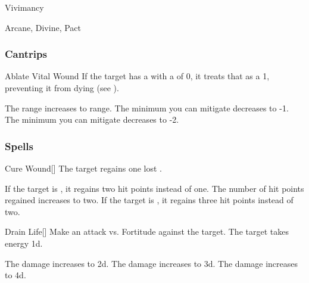\newpage
\begin{spellsection}{Vivimancy}

\begin{spellheader}
\end{spellheader}


 Arcane, Divine, Pact

\subsubsection{Cantrips}


\begin{freeability}{Ablate Vital Wound}
If the target has a  with a  of 0, it treats that  as a 1, preventing it from dying (see ).

\rankline
{} The range increases to \rngmed range.
 The minimum  you can mitigate decreases to -1.
 The minimum  you can mitigate decreases to -2.
\end{freeability}

\end{spellsection}


\subsubsection{Spells}


\lowercase{\hypertarget{spell:Cure Wound}{}}\label{spell:Cure Wound}
\begin{freeability}[Rank 1]{\hypertarget{spell:Cure Wound}{Cure Wound}}[]
The target regains one lost .

\rankline
{} If the target is , it regains two hit points instead of one.
 The number of hit points regained increases to two.
 If the target is , it regains three hit points instead of two.

\end{freeability}
\vspace{0.25em}



\lowercase{\hypertarget{spell:Drain Life}{}}\label{spell:Drain Life}
\begin{freeability}[Rank 1]{\hypertarget{spell:Drain Life}{Drain Life}}[]
Make an attack vs. Fortitude against the target.
\hit The target takes energy  \plus1d.

\rankline
{} The damage increases to  \plus2d.
 The damage increases to  \plus3d.
 The damage increases to  \plus4d.

\end{freeability}
\vspace{0.25em}



